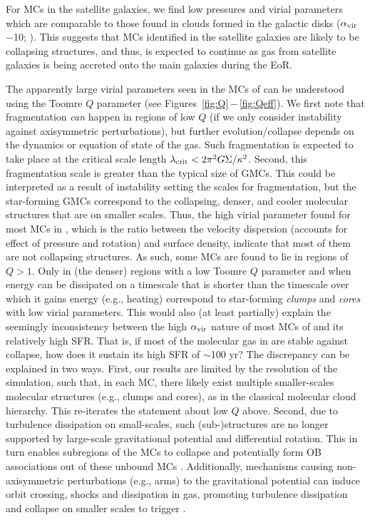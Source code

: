 \IfFileExists{emulateapjlegacy.cls}{\documentclass[iop]{emulateapjlegacy}}{\documentclass[iop]{emulateapj}}
\begin{document}
For MCs in the satellite galaxies, we find low pressures and virial parameters 
which are comparable to those found in clouds formed in the galactic disks 
($\alpha_{\rm vir}$$-$10; \citealt{Dobbs08a, Tasker09a}).
This suggests that MCs identified in the satellite galaxies are likely to be collapsing structures,
and thus, \SF is expected to continue 
as gas from satellite galaxies is being accreted onto the main galaxies during the EoR.

The apparently large virial parameters seen in the MCs of \flower can be understood using the 
Toomre $Q$ parameter (see Figures~\ref{fig:Q}\,$-$\,\ref{fig:Qeff}). 
We first note that fragmentation {\it can} happen in regions of low $Q$ (if we only consider 
instability against axisymmetric perturbations), but  
further evolution/collapse depends on the dynamics or equation of state of the gas. 
Such fragmentation is expected to take place at the
critical scale length $\lambda_{\rm crit} < 2 \pi^2 G \Sigma / \kappa^2$.
Second, this fragmentation scale is greater than the typical size of GMCs. This could be interpreted as a result of instability setting the scales for fragmentation, but the star-forming GMCs
correspond to the collapsing, denser, and cooler molecular structures that are on smaller scales. 
Thus, the high virial parameter found 
for most MCs in \flower, which is the ratio between the velocity dispersion (accounts for effect of pressure 
and rotation) and surface density, indicate that most of them are not collapsing structures. 
As such, some MCs are found to lie in regions of $Q>1$. 
Only in (the denser) regions with a low Toomre $Q$ parameter and 
when energy can be dissipated on a timescale 
that is shorter than the timescale over which it gains energy (e.g., heating) 
correspond to star-forming {\it clumps} and {\it cores} with low virial parameters.
This would also (at least partially) explain the seemingly inconsistency between the high $\alpha_{\rm vir}$
nature of most MCs of \flower and its relatively high SFR.
That is, if most of the molecular gas in \flower are stable against collapse, 
how does it sustain its high SFR of $\sim$100\,\Msun\,yr\pmOne?
The discrepancy can be explained in two ways.
First, our results are limited by the resolution of the simulation, such that, in each MC, there
likely exist multiple smaller-scales molecular structures (e.g., clumps and cores),
as in the classical molecular cloud hierarchy. This re-iterates the statement about low $Q$ above.
Second, due to turbulence dissipation on small-scales, such (sub-)structures are no longer supported by
large-scale gravitational potential and differential rotation.
This in turn enables subregions of the MCs to collapse and potentially form OB associations out of these unbound
MCs \citep{Clark04a, Clark05a}.
Additionally, mechanisms causing non-axisymmetric perturbations (e.g., arms) to the gravitational potential
can induce orbit crossing, shocks and dissipation in gas, promoting turbulence dissipation
and collapse on smaller scales to trigger \SF.
\end{document}
